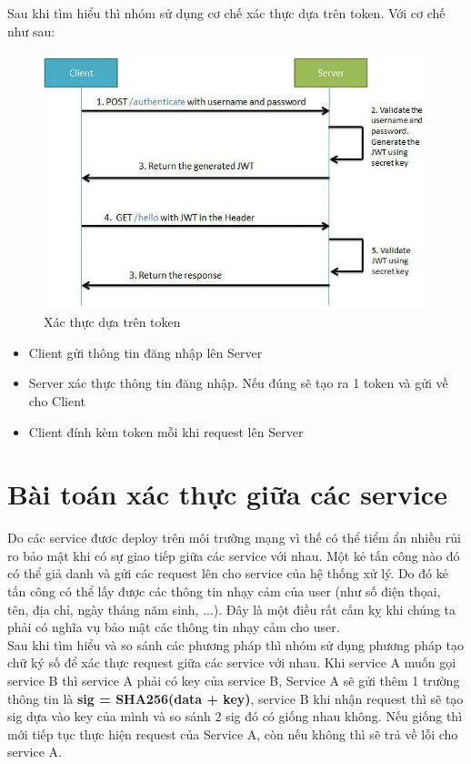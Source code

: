 		Sau khi tìm hiểu thì nhóm sử dụng cơ chế xác thực dựa trên token. Với cơ chế như sau:
		
		\begin{figure}[H]
			\includegraphics[width=1\textwidth]{Images/authbasedtoken.jpg}
			\centering
			\linebreak
			\caption{Xác thực dựa trên token}
		\end{figure}
		
		\begin{itemize}
                \item Client gửi thông tin đăng nhập lên Server
                \item Server xác thực thông tin đăng nhập. Nếu đúng sẽ tạo ra 1 token và gửi về cho Client
                \item Client đính kèm token mỗi khi request lên Server 
            \end{itemize}
		
		
		\section{Bài toán xác thực giữa các service}
		Do các service đươc deploy trên môi trường mạng vì thế có thể tiểm ẩn nhiều rủi ro bảo mật khi có sự giao tiếp giữa các service với nhau. Một kẻ tấn công nào đó có thể giả danh và gửi các request lên cho service của hệ thống xử lý. Do đó kẻ tấn công có thể lấy được các thông tin nhạy cảm của user (như số điện thọai, tên, địa chỉ, ngày tháng năm sinh, ...). Đây là một điều rất cấm kỵ khi chúng ta phải có nghĩa vụ bảo mật các thông tin nhạy cảm cho user.\\
		
		Sau khi tìm hiểu và so sánh các phương pháp thì nhóm sử dụng phương pháp tạo chữ ký số để xác thực request giữa các service với nhau. Khi service A muốn gọi service B thì service A phải có key của service B, Service A sẽ gửi thêm 1 trường thông tin là \textbf{sig = SHA256(data + key)}, service B khi nhận request thì sẽ tạo sig dựa vào key của mình và so sánh 2 sig đó có giống nhau không. Nếu giống thì mới tiếp tục thực hiện request của Service A, còn nếu không thì sẽ trả về lỗi cho service A.
		

